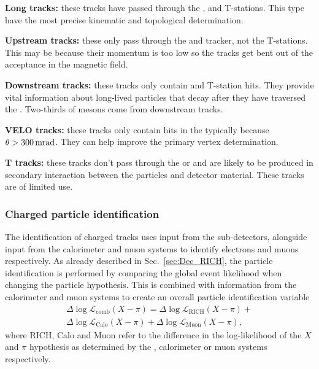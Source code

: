 \begin{description}
\item \textbf{Long tracks:} these tracks have passed through the \velo, \ttracker and T-stations. This type have the most precise kinematic and topological determination.
\item \textbf{Upstream tracks:} these only pass through the \velo and \ttracker tracker, not the T-stations. This may be because their momentum is too low so the tracks get bent out of the acceptance in the magnetic field.
\item \textbf{Downstream tracks:} these tracks only contain \ttracker and T-station hits. They provide vital information about long-lived particles that decay after they have traversed the \velo.  Two-thirds of \KS mesons come from downstream tracks. 
\item \textbf{VELO tracks:} these tracks only contain hits in the \velo typically because $\theta > 300\mathrm{ \,mrad}$. They can help improve the primary vertex determination. 
\item \textbf{T tracks:} these tracks don't pass through the \velo or \ttracker and are likely to be produced in secondary interaction between the particles and detector material. These tracks are of limited use.
\end{description}

\subsubsection{Charged particle identification}

The identification of charged tracks uses input from the \rich sub-detectors, alongside input from the calorimeter and muon systems to identify electrons and muons respectively. 
As already described in Sec.~\ref{sec:Dec_RICH}, the \rich particle identification is performed by comparing the global event likelihood when changing the particle hypothesis. 
This is combined with information from the calorimeter and muon systems to create an overall particle identification variable
\begin{multline}
\Delta \log{\mathcal{L}_\text{comb}}(X-\pi) =  \Delta \log{\mathcal{L}_\text{RICH}}(X-\pi) + \\
 \Delta \log{\mathcal{L}_\text{Calo}}(X-\pi) + \Delta \log{\mathcal{L}_\text{Muon}}(X-\pi),
\end{multline}
where RICH, Calo and Muon refer to the difference in the log-likelihood of the $X$ and $\pi$ hypothesis as determined by the \rich, calorimeter or muon systems respectively. 

